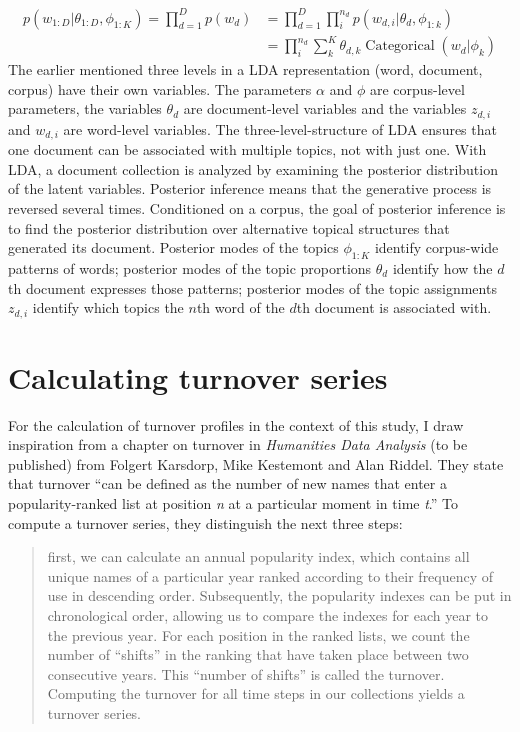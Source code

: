 \begin{equation}
\begin{aligned} p\left(w_{1 : D} | \theta_{1 : D}, \phi_{1 : K}\right)=\prod_{d=1}^{D} p\left(w_{d}\right) &=\prod_{d=1}^{D} \prod_{i}^{n_{d}} p\left(w_{d, i} | \theta_{d}, \phi_{1 : k}\right) \\ &=\prod_{i}^{n_{d}} \sum_{k}^{K} \theta_{d, k} \operatorname{Categorical}\left(w_{d} | \phi_{k}\right) \end{aligned}
\end{equation}
\noindent The earlier mentioned three levels in a LDA representation (word, document, corpus) have their own variables. The parameters $\alpha$ and $\phi$ are corpus-level parameters, the variables $\theta_{d}$ are document-level variables and the variables $z_{d,i}$ and $w_{d,i}$ are word-level variables. The three-level-structure of LDA ensures that one document can be associated with multiple topics, not with just one. \autocite[997]{blei_latent_nodate} With LDA, a document collection is analyzed by examining the posterior distribution of the latent variables. Posterior inference means that the generative process is reversed several times. Conditioned on a corpus, the goal of posterior inference is to find the posterior distribution over alternative topical structures that generated its document.\autocite{blei_probabilistic_2010} Posterior modes of the topics $\phi_{1:K}$ identify corpus-wide patterns of words; posterior modes of the topic proportions $\theta_{d}$ identify how the $d$th document expresses those patterns; posterior modes of the topic assignments $z_{d,i}$ identify which topics the $n$th word of the $d$th document is associated with.\autocite{blei_probabilistic_2010}

\section{Calculating turnover series}
For the calculation of turnover profiles in the context of this study, I draw inspiration from a chapter on turnover in \textit{Humanities Data Analysis} (to be published) from Folgert Karsdorp, Mike Kestemont and Alan Riddel. They state that turnover \enquote{can be defined as the number of new names that enter a popularity-ranked list at position \textit{n} at a particular moment in time \textit{t}.}\autocite[126]{karsdorp_humanities_2019} To compute a turnover series, they distinguish the next three steps:

\begin{quote}
	first, we can calculate an annual popularity index, which contains all unique names of a particular year ranked according to their frequency of use in descending order. Subsequently, the popularity indexes can be put in chronological order, allowing us to compare the indexes for each year to the previous year. For each position in the ranked lists, we count the number of \enquote{shifts} in the ranking that have taken place between two consecutive years. This \enquote{number of shifts} is called the turnover. Computing the turnover for all time steps in our collections yields a turnover series.\autocite[126]{karsdorp_humanities_2019}
\end{quote}


